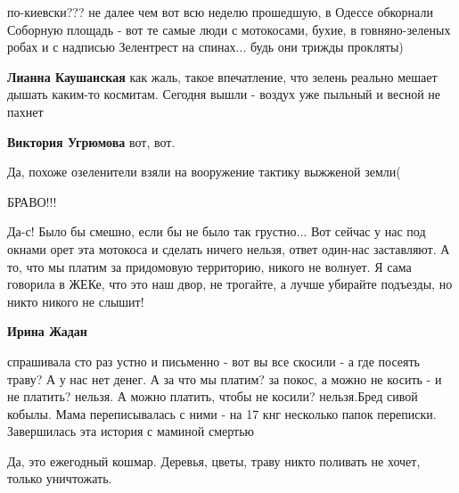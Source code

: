  
 
 
 
 
\zzSecCmt

\begin{itemize} %

по-киевски??? не далее чем вот всю неделю прошедшую, в Одессе обкорнали
Соборную площадь - вот те самые люди с мотокосами, бухие, в говняно-зеленых
робах и с надписью Зелентрест на спинах... будь они трижды прокляты)

\begin{itemize} %
\textbf{Лианна Каушанская} как жаль, такое впечатление, что зелень реально мешает дышать каким-то космитам. Сегодня вышли - воздух уже пыльный и весной не пахнет

\textbf{Виктория Угрюмова} вот, вот.
\end{itemize} %

Да, похоже озеленители взяли на вооружение тактику выжженой земли(

БРАВО!!!


Да-с! Было бы смешно, если бы не было так грустно... Вот сейчас у нас под
окнами орет эта мотокоса и сделать ничего нельзя, ответ один-нас заставляют. А
то, что мы платим за придомовую территорию, никого не волнует. Я сама говорила
в ЖЕКе, что это наш двор, не трогайте, а лучше убирайте подъезды, но никто
никого не слышит!

\begin{itemize} %
\textbf{Ирина Жадан} 

спрашивала сто раз устно и письменно - вот вы все скосили - а где посеять
траву? А у нас нет денег. А за что мы платим? за покос, а можно не косить - и
не платить? нельзя. А можно платить, чтобы не косили? нельзя.Бред сивой кобылы.
Мама переписывалась с ними - на 17 кнг несколько папок переписки. Завершилась
эта история с маминой смертью


Да, это ежегодный кошмар. Деревья, цветы, траву никто поливать не хочет, только уничтожать.


\end{itemize}
\end{itemize}
